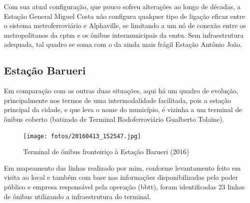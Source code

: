 	Com sua atual configuração, que pouco sofreu alterações ao longo de décadas, a Estação General Miguel Costa não configura qualquer tipo de ligação eficaz entre o sistema metroferroviário e Alphaville, se limitando a um nó de conexão entre os metropolitanos da \gls{cptm} e os ônibus intermunicipais da \gls{emtu}. Sem infraestrutura adequada, tal quadro se soma com o da ainda mais frágil Estação Antônio João.
	
	\subsection{Estação Barueri}
	
	Em comparação com as outras duas situações, aqui há um quadro de evolução, principalmente nos termos de uma intermodalidade facilitada, pois a estação principal da cidade, e que leva o nome do município, é vizinha a um terminal de ônibus coberto (batizado de Terminal Rodoferroviário Gualberto Tolaine).
	
	\begin{figure}[h]
		\caption{Terminal de ônibus fronteiriço à Estação Barueri (2016)}
		\texttt{[image: fotos/20160413\_152547.jpg]}
	\end{figure}

	Em mapeamento das linhas realizado por mim, conforme levantamento feito em visita ao local e também com base nas informações disponibilizadas pelo poder público e empresa responsável pela operação ({\glsdesc*{bbtt}}), foram identificadas 23 linhas de ônibus utilizando a infraestrutura do terminal.	
	

